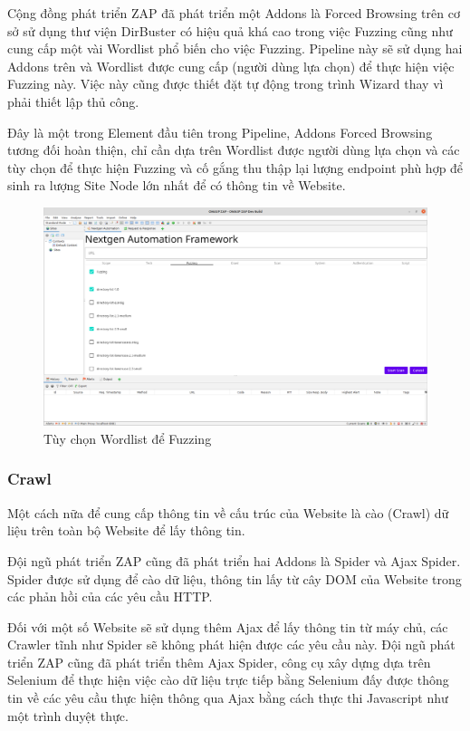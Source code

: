 \documentclass[./../main.tex]{subfiles}
\begin{document}
Cộng đồng phát triển ZAP đã phát triển một Addons là Forced Browsing trên cơ sở sử dụng thư viện DirBuster có hiệu quả khá cao trong việc Fuzzing cũng như cung cấp một vài Wordlist phổ biến cho việc Fuzzing. Pipeline này sẽ sử dụng hai Addons trên và Wordlist được cung cấp (người dùng lựa chọn) để thực hiện việc Fuzzing này. Việc này cũng được thiết đặt tự động trong trình Wizard thay vì phải thiết lập thủ công.

Đây là một trong Element đầu tiên trong Pipeline, Addons Forced Browsing tương đối hoàn thiện, chỉ cần dựa trên Wordlist được người dùng lựa chọn và các tùy chọn để thực hiện Fuzzing và cố gắng thu thập lại lượng endpoint phù hợp để sinh ra lượng Site Node lớn nhất để có thông tin về Website.

\begin{figure}[H]
	\includegraphics[width=\linewidth]{./images/fuzz.png}
	\caption{Tùy chọn Wordlist để Fuzzing}
	\label{fig:fuzz}
\end{figure}

\subsubsection{Crawl}

Một cách nữa để cung cấp thông tin về cấu trúc của Website là cào (Crawl) dữ liệu trên toàn bộ Website để lấy thông tin.

Đội ngũ phát triển ZAP cũng đã phát triển hai Addons là Spider và Ajax Spider. Spider được sử dụng để cào dữ liệu, thông tin lấy từ cây DOM của Website trong các phản hồi của các yêu cầu HTTP.

Đối với một số Website sẽ sử dụng thêm Ajax để lấy thông tin từ máy chủ, các Crawler tĩnh như Spider sẽ không phát hiện được các yêu cầu này. Đội ngũ phát triển ZAP cũng đã phát triển thêm Ajax Spider, công cụ xây dựng dựa trên Selenium để thực hiện việc cào dữ liệu trực tiếp bằng Selenium đấy được thông tin về các yêu cầu thực hiện thông qua Ajax bằng cách thực thi Javascript như một trình duyệt thực.
\end{document}
